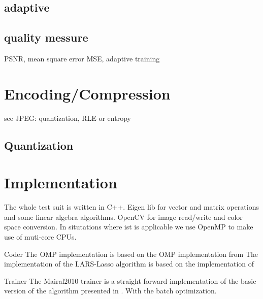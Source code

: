 \subsection{adaptive}

\subsection{quality messure}
PSNR, mean square error MSE, adaptive training 

\section{Encoding/Compression}
see JPEG: quantization, RLE or entropy

\subsection{Quantization}


\section{Implementation}

The whole test suit is written in C++.
Eigen lib for vector and matrix operations and some linear algebra algorithms.
OpenCV for image read/write and color space conversion.
In situtations where ist is applicable we use OpenMP to make use of muti-core CPUs. 

Coder
The OMP implementation is based on the OMP implementation from \cite{OMPBox}
The implementation of the LARS-Lasso algorithm is based on the implementation of \cite{lars.m}

Trainer
The Mairal2010 trainer is a straight forward implementation of the basic version of the algorithm presented in \cite{Mairal2010}.
With the batch optimization.


